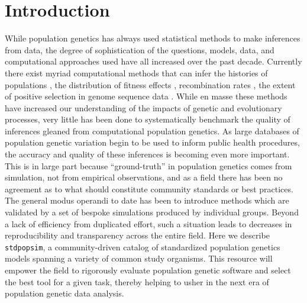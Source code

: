 \documentclass[12pt,halfline,a4paper]{ouparticle}
\newcommand{\stdpopsim}{\texttt{stdpopsim}\xspace}
\begin{document}
\section*{Introduction}
While population genetics has always used statistical methods to make inferences from data,
the degree of sophistication of the questions, models, data, and computational approaches
used have all increased over the past decade. Currently there exist myriad computational methods
that can infer the histories of populations 
\citep{gutenkunst2009inferring,li2011inference,excoffier2013robust,schiffels2014inferring, terhorst2017robust,ragsdale2019models}, 
the distribution of fitness effects \citep{kim2017inference},
recombination rates \citep{chan2012genome,lin2013fast,Adrion662247}, 
the extent of positive selection in genome sequence data
\citep{eyre2009estimating, alachiotis2012omegaplus,degiorgio2016sweepfinder2,kern2018diplos,sugden2018localization}.
While en masse these methods have increased our understanding of the
impacts of genetic and evolutionary processes, very little has been done to systematically
benchmark the quality of inferences gleaned from computational population genetics.
As large databases of population genetic variation begin to be used to inform public health procedures,
the accuracy and quality of these inferences is becoming even more important.
This is in large part because ``ground-truth'' in population genetics comes from simulation,
not from empirical observations, and as a field there has been no agreement as to what should
constitute community standards or best practices. The general modus operandi to date has been to
introduce methods which are validated by a set of bespoke simulations produced by individual
groups. Beyond a lack of efficiency from duplicated effort, such a situation leads
to decreases in reproducibility and transparency across the entire field.
Here we describe \stdpopsim, a community-driven catalog
of standardized population genetics models spanning a variety of common study organisms.
This resource will empower the field to rigorously evaluate population genetic software
and select the best tool for a given task, thereby helping to usher in the next era of population genetic data analysis.
\end{document}
